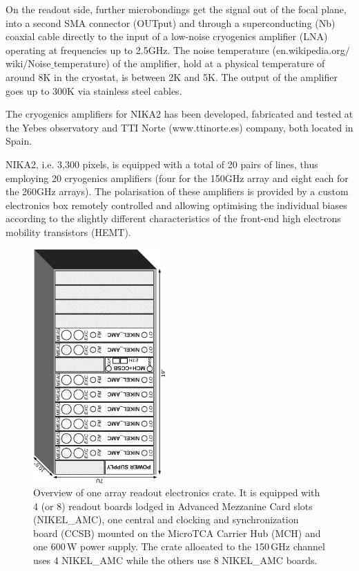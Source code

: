 \documentclass[]{aa} %
\begin{document}
On the readout side, further microbondings get the signal out of the focal plane, into a second SMA connector (OUTput) and through a superconducting (Nb) coaxial cable directly to the input of a low-noise cryogenics amplifier (LNA) operating at frequencies up to 2.5GHz. The noise temperature (en.wikipedia.org$/$wiki$/$Noise$\_$temperature) of the amplifier, hold at a physical temperature of around 8K in the cryostat, is between 2K and 5K.  The output of the amplifier goes up to 300K via stainless steel cables. 

The cryogenics amplifiers for NIKA2 has been developed, fabricated and tested at the Yebes observatory and TTI Norte (www.ttinorte.es) company, both located in Spain. 

NIKA2, i.e. 3,300 pixels, is equipped with a total of 20 pairs of lines, thus employing 20 cryogenics amplifiers (four for the 150GHz array and eight each for the 260GHz arrays). The polarisation of these amplifiers is provided by a custom electronics box remotely controlled and allowing optimising the individual biases according to the slightly different characteristics of the front-end high electrons mobility transistors (HEMT). 

\begin{figure}
\begin{center}
\includegraphics[angle=-90,width=0.45\textwidth]{NIKA_crate}
\caption{Overview of one array readout electronics crate.
It is equipped with 4 (or 8) readout boards lodged in Advanced Mezzanine Card slots (NIKEL\_AMC), one central and clocking and synchronization board (CCSB) mounted on the MicroTCA Carrier Hub (MCH) and one 600\,W power supply.
The crate allocated to the 150\,GHz channel uses 4 NIKEL\_AMC while the others use 8 NIKEL\_AMC boards.
\label{crateFig}}
\end{center}
\end{figure}
\end{document}
